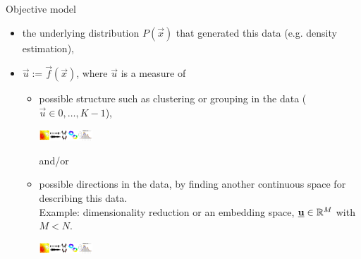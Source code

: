 \begin{frame}{Objective model}

\begin{itemize}
\item the underlying distribution $P(\vec x)$ that generated this data (e.g. density estimation),
\item $\vec u := \vec f(\vec x)$, where $\vec u$ is a measure of 
\begin{itemize}
\item possible structure such as clustering or grouping in the data ($\vec u \in {0,\ldots,K-1}$), \\

\svspace{-5mm}

\begin{center}
	\includegraphics[trim=260 0 140 0,clip, width=2cm]{img/mi2}
\end{center}

\svspace{-15mm}

and/or\\

\vspace{7mm}

\item possible directions in the data, by finding another continuous space for describing this data. \\

Example: dimensionality reduction or an embedding space, $\underline{\mathbf{u}} \in \mathbb{R}^M$ with $M < N$.


\svspace{-5mm}

\begin{center}
	\includegraphics[trim=0 0 400 0,clip, width=2cm]{img/mi2}
\end{center}

\end{itemize}
\end{itemize}

\end{frame}
